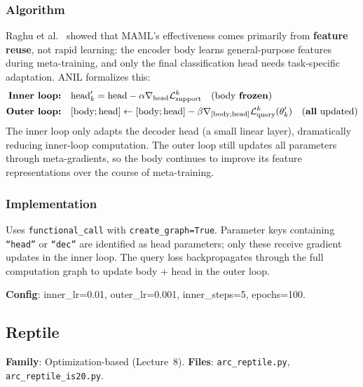 \documentclass[11pt,a4paper]{article}
\begin{document}
\subsubsection{Algorithm}
Raghu et al.~\cite{raghu2020} showed that MAML's effectiveness comes primarily from \textbf{feature reuse}, not rapid learning: the encoder body learns general-purpose features during meta-training, and only the final classification head needs task-specific adaptation. ANIL formalizes this:
\begin{align}
  \textbf{Inner loop:} \quad & \text{head}'_k = \text{head} - \alpha \nabla_{\text{head}} \mathcal{L}_{\text{support}}^k \quad \text{(body \textbf{frozen})} \\
  \textbf{Outer loop:} \quad & [\text{body}; \text{head}] \leftarrow [\text{body}; \text{head}] - \beta \nabla_{[\text{body};\text{head}]} \mathcal{L}_{\text{query}}^k(\theta'_k) \quad \text{(\textbf{all} updated)}
\end{align}
The inner loop only adapts the decoder head (a small linear layer), dramatically reducing inner-loop computation. The outer loop still updates all parameters through meta-gradients, so the body continues to improve its feature representations over the course of meta-training.

\subsubsection{Implementation}
Uses \texttt{functional\_call} with \texttt{create\_graph=True}. Parameter keys containing \texttt{``head''} or \texttt{``dec''} are identified as head parameters; only these receive gradient updates in the inner loop. The query loss backpropagates through the full computation graph to update body + head in the outer loop.

\textbf{Config}: inner\_lr=0.01, outer\_lr=0.001, inner\_steps=5, epochs=100.

\subsection{Reptile~\cite{nichol2018}}
\textbf{Family}: Optimization-based (Lecture~8). \textbf{Files}: \texttt{arc\_reptile.py}, \texttt{arc\_reptile\_is20.py}.
\end{document}
